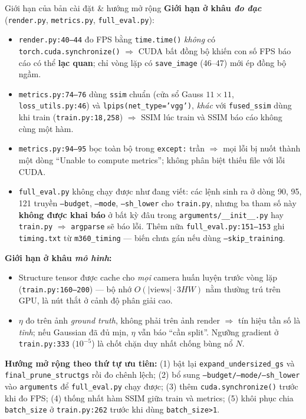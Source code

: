 \begin{frame}{Giới hạn của bản cài đặt \& hướng mở rộng}
\scriptsize
\textbf{Giới hạn ở khâu \emph{đo đạc}} (\texttt{render.py}, \texttt{metrics.py}, \texttt{full\_eval.py}):
\begin{itemize}\setlength{\itemsep}{1pt}
    \item \texttt{render.py:40--44} đo FPS bằng \texttt{time.time()} \emph{không} có \texttt{torch.cuda.synchronize()} $\Rightarrow$ CUDA bất đồng bộ khiến con số FPS báo cáo có thể \textbf{lạc quan}; chỉ vòng lặp có \texttt{save\_image} (46--47) mới ép đồng bộ ngầm.
    \item \texttt{metrics.py:74--76} dùng \texttt{ssim} chuẩn (cửa sổ Gauss $11{\times}11$, \texttt{loss\_utils.py:46}) và \texttt{lpips(net\_type='vgg')}, \emph{khác} với \texttt{fused\_ssim} dùng khi train (\texttt{train.py:18,258}) $\Rightarrow$ SSIM lúc train và SSIM báo cáo không cùng một hàm.
    \item \texttt{metrics.py:94--95} bọc toàn bộ trong \texttt{except:} trần $\Rightarrow$ mọi lỗi bị nuốt thành một dòng ``Unable to compute metrics''; không phân biệt thiếu file với lỗi CUDA.
    \item \alert{\texttt{full\_eval.py} không chạy được như đang viết}: các lệnh sinh ra ở dòng 90, 95, 121 truyền \texttt{--budget}, \texttt{--mode}, \texttt{--sh\_lower} cho \texttt{train.py}, nhưng ba tham số này \textbf{không được khai báo} ở bất kỳ đâu trong \texttt{arguments/\_\_init\_\_.py} hay \texttt{train.py} $\Rightarrow$ \texttt{argparse} sẽ báo lỗi. Thêm nữa \texttt{full\_eval.py:151--153} ghi \texttt{timing.txt} từ \texttt{m360\_timing} --- biến chưa gán nếu dùng \texttt{--skip\_training}.
\end{itemize}
\textbf{Giới hạn ở khâu \emph{mô hình}:}
\begin{itemize}\setlength{\itemsep}{1pt}
    \item Structure tensor được cache cho \emph{mọi} camera huấn luyện trước vòng lặp (\texttt{train.py:160--200}) --- bộ nhớ $O(|\text{views}|\cdot 3HW)$ nằm thường trú trên GPU, là nút thắt ở cảnh độ phân giải cao.
    \item $\eta$ đo trên ảnh \emph{ground truth}, không phải trên ảnh render $\Rightarrow$ tín hiệu tần số là \emph{tĩnh}; nếu Gaussian đã đủ mịn, $\eta$ vẫn báo ``cần split''. Ngưỡng gradient ở \texttt{train.py:333} ($10^{-5}$) là chốt chặn duy nhất chống bùng nổ $N$.
\end{itemize}
\textbf{Hướng mở rộng theo thứ tự ưu tiên:} (1) bật lại \texttt{expand\_undersized\_gs} và \texttt{final\_prune\_structgs} rồi đo chênh lệch; (2) bổ sung \texttt{--budget/--mode/--sh\_lower} vào \texttt{arguments} để \texttt{full\_eval.py} chạy được; (3) thêm \texttt{cuda.synchronize()} trước khi đo FPS; (4) thống nhất hàm SSIM giữa train và metrics; (5) khôi phục chia \texttt{batch\_size} ở \texttt{train.py:262} trước khi dùng \texttt{batch\_size>1}.
\end{frame}
